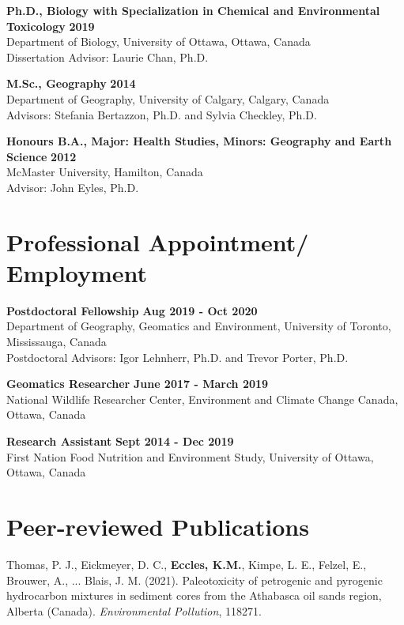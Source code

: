 \documentclass[margin,line]{res}
\begin{document}
\begin{resume}
\textbf{Ph.D., Biology with Specialization in Chemical and Environmental Toxicology} \hfill {\bf 2019}\\
Department of Biology, University of Ottawa, Ottawa, Canada \\
Dissertation Advisor: Laurie Chan, Ph.D.

\textbf{M.Sc., Geography}  \hfill {\bf 2014}\\
Department of Geography, University of Calgary, Calgary, Canada\\
Advisors:  Stefania Bertazzon, Ph.D. and Sylvia Checkley, Ph.D.

\textbf{Honours B.A., Major: Health Studies, Minors: Geography and Earth Science }\hfill {\bf 2012}\\
McMaster University, Hamilton, Canada\\
Advisor: John Eyles, Ph.D.

\vspace*{.1in}
\section{\sc Professional Appointment/ Employment}
{\bf Postdoctoral Fellowship} \hfill {\bf Aug 2019 - Oct 2020}\\
Department of Geography, Geomatics and Environment, University of Toronto, Mississauga, Canada\\
Postdoctoral Advisors: Igor Lehnherr, Ph.D. and Trevor Porter, Ph.D.

{\bf Geomatics Researcher} \hfill {\bf June 2017 - March 2019}\\
National Wildlife Researcher Center, Environment and Climate Change Canada, Ottawa, Canada

{\bf Research Assistant} \hfill {\bf Sept 2014 - Dec 2019}\\
First Nation Food Nutrition and Environment Study, University of Ottawa, Ottawa, Canada

\vspace*{.1in}
\section{\sc Peer-reviewed Publications}

Thomas, P. J., Eickmeyer, D. C., \textbf{Eccles, K.M.}, Kimpe, L. E., Felzel, E., Brouwer, A., ... Blais, J. M. (2021). Paleotoxicity of petrogenic and pyrogenic hydrocarbon mixtures in sediment cores from the Athabasca oil sands region, Alberta (Canada). \textit{Environmental Pollution}, 118271.


\end{resume}
\end{document}
